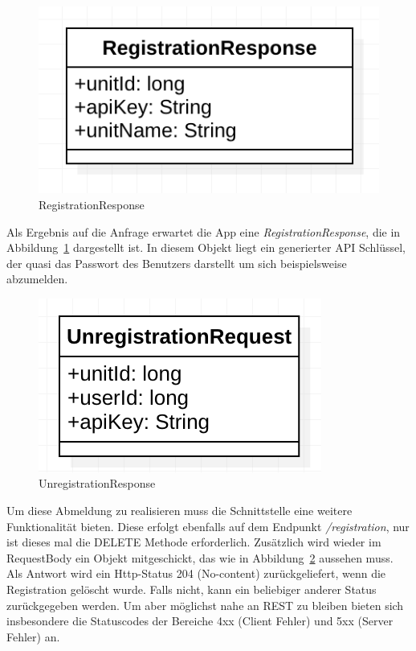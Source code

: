 \begin{figure}[h]
	\centering
	\includegraphics{include/img/registrationresponse}
	\caption{RegistrationResponse}
	\label{fig:registrationResponse}
\end{figure}
Als Ergebnis auf die Anfrage erwartet die App eine \textit{RegistrationResponse}, die in Abbildung~\ref{fig:registrationResponse} dargestellt ist. In diesem Objekt liegt ein generierter API Schlüssel, der quasi das Passwort des Benutzers darstellt um sich beispielsweise abzumelden.

\begin{figure}[h]
	\centering
	\includegraphics{include/img/unregistrationrequest}
	\caption{UnregistrationResponse}
	\label{fig:unregistrationResponse}
\end{figure}

Um diese Abmeldung zu realisieren muss die Schnittstelle eine weitere Funktionalität bieten. Diese erfolgt ebenfalls auf dem Endpunkt \textit{/registration}, nur ist dieses mal die DELETE Methode erforderlich. Zusätzlich wird wieder im RequestBody ein Objekt mitgeschickt, das wie in Abbildung~\ref{fig:unregistrationResponse} aussehen muss. Als Antwort wird ein Http-Status 204 (No-content) zurückgeliefert, wenn die Registration gelöscht wurde. Falls nicht, kann ein beliebiger anderer Status zurückgegeben werden. Um aber möglichst nahe an REST zu bleiben bieten sich insbesondere die Statuscodes der Bereiche 4xx (Client Fehler) und 5xx (Server Fehler) an.

